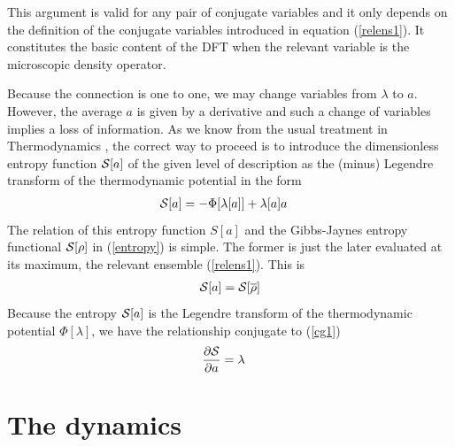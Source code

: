\documentclass[b5paper,openright,10pt]{book}
\begin{document}
This argument is  valid for  any pair  of conjugate variables  and it
only depends on  the definition of the  conjugate variables introduced
in equation (\ref{relens1}).  It constitutes  the basic content of the DFT
when the relevant variable is the microscopic density operator.

Because the  connection is one  to one,  we may change  variables from
$\lambda$ to $a$.   However, the average $a$ is given  by a derivative
and such a  change of variables implies a loss  of information.  As we
know from the usual treatment in Thermodynamics \cite{Callen1960}, the
correct way to proceed is to  introduce the dimensionless entropy function ${\cal S}[a]$ of
the given  level of description  as the (minus) Legendre  transform of
the thermodynamic potential in the form
\begin{align}
  {\cal S}[a] &=-\Phi[\lambda[a]]+\lambda[a] a
\label{entropya}\end{align}
The  relation of  this entropy  function $S[a]$  and the  Gibbs-Jaynes
entropy functional  ${\cal S}[\rho]$ in  (\ref{entropy}) is
simple. The  former is just  the later  evaluated at its  maximum, the
relevant ensemble (\ref{relens1}). This is
\begin{align}
  {\cal S}[a]={\cal  S}[\overline{\rho}]
\end{align}
Because  the  entropy   ${\cal S}[a]$  is  the  Legendre   transform  of  the
thermodynamic  potential  $\Phi[\lambda]$,  we have  the  relationship
conjugate to (\ref{cg1})
\begin{align}
  \frac{\partial {\cal S}}{\partial a}&=\lambda
\label{e3}
\end{align}


\section{The dynamics}\label{Sec:Grabert}
\end{document}
